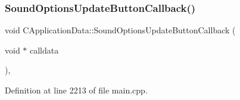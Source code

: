 \hypertarget{classCApplicationData_ae63c8ca19ddeb92a3aaf0a5d67d09e58}{}\label{classCApplicationData_ae63c8ca19ddeb92a3aaf0a5d67d09e58} 
\subsubsection{\texorpdfstring{Sound\+Options\+Update\+Button\+Callback()}{SoundOptionsUpdateButtonCallback()}}
{\footnotesize\ttfamily void C\+Application\+Data\+::\+Sound\+Options\+Update\+Button\+Callback (\begin{DoxyParamCaption}\item[{void $\ast$}]{calldata }\end{DoxyParamCaption})\hspace{0.3cm}{\ttfamily [static]}, {\ttfamily [protected]}}



Definition at line 2213 of file main.\+cpp.


